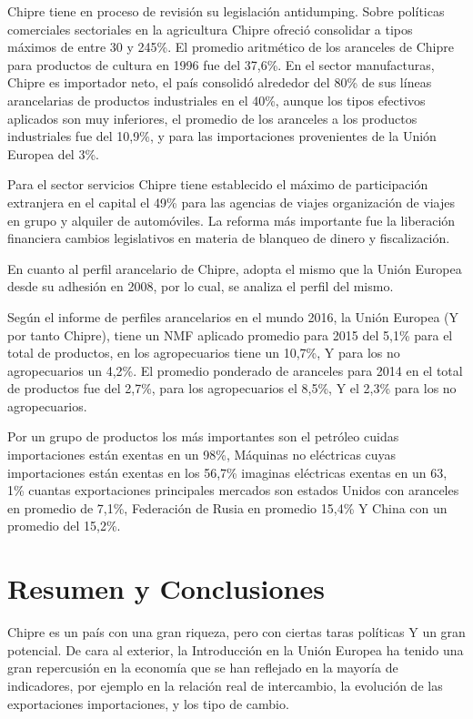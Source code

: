 \documentclass[a4paper,openright,12pt]{book}
\begin{document}
Chipre tiene en proceso de revisión su legislación antidumping. Sobre políticas comerciales sectoriales en la agricultura Chipre ofreció consolidar a tipos máximos de entre 30 y 245\%. El promedio aritmético de los aranceles de Chipre para productos de cultura en 1996 fue del 37,6\%. En el sector manufacturas, Chipre es importador neto, el país consolidó alrededor del 80\% de sus líneas arancelarias de productos industriales en el 40\%, aunque los tipos efectivos aplicados son muy inferiores, el promedio de los aranceles a los productos industriales fue del 10,9\%,  y para las importaciones provenientes de la Unión Europea del 3\%.

Para el sector servicios Chipre tiene establecido el máximo de participación extranjera en el capital el 49\% para las agencias de viajes organización de viajes en grupo y alquiler de automóviles. La reforma más importante fue la liberación financiera cambios legislativos en materia de blanqueo de dinero y fiscalización.

En cuanto al perfil arancelario de Chipre, adopta el mismo que la Unión Europea desde su adhesión en 2008, por lo cual, se analiza el perfil del mismo.

Según el informe de perfiles arancelarios en el mundo 2016, la Unión Europea (Y por tanto Chipre), tiene un NMF aplicado promedio para 2015 del 5,1\% para el total de productos, en los agropecuarios tiene un 10,7\%, Y para los no agropecuarios un 4,2\%. El promedio ponderado de aranceles para 2014 en el total de productos fue del 2,7\%, para los agropecuarios el 8,5\%, Y el 2,3\% para los no agropecuarios.

Por un grupo de productos los más importantes son el petróleo cuidas importaciones están exentas en un 98\%, Máquinas no eléctricas cuyas importaciones están exentas en los 56,7\% imaginas eléctricas exentas en un 63, 1\% cuantas exportaciones principales mercados son estados Unidos con aranceles en promedio de 7,1\%, Federación de Rusia en promedio 15,4\% Y China con un promedio del 15,2\%.

\chapter{Resumen y Conclusiones}

Chipre es un país con una gran riqueza, pero con ciertas taras políticas Y un gran potencial. De cara al exterior, la Introducción en la Unión Europea ha tenido una gran repercusión en la economía que se han reflejado en la mayoría de indicadores, por ejemplo en la relación real de intercambio, la evolución de las exportaciones importaciones, y los tipo de cambio.
\end{document}
